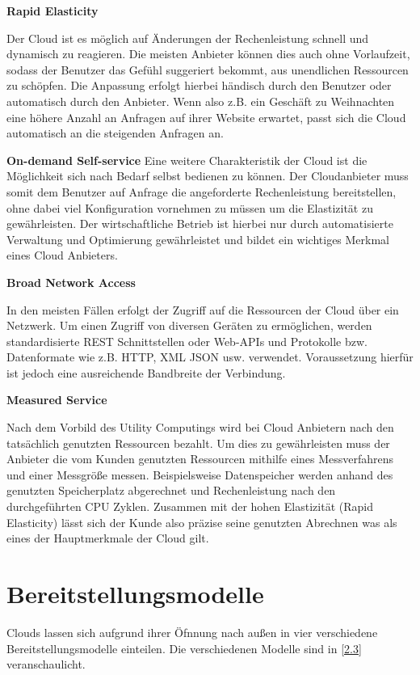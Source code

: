 \textbf{Rapid Elasticity}

Der Cloud ist es möglich auf Änderungen der Rechenleistung schnell und dynamisch zu reagieren. Die meisten Anbieter können dies auch ohne Vorlaufzeit, sodass der Benutzer das Gefühl suggeriert bekommt, aus unendlichen Ressourcen zu schöpfen. Die Anpassung erfolgt hierbei händisch durch den Benutzer oder automatisch durch den Anbieter. Wenn also z.B. ein Geschäft zu Weihnachten eine höhere Anzahl an Anfragen auf ihrer Website erwartet, passt sich die Cloud automatisch an die steigenden Anfragen an. \cite*[]{DAAS}
   
\textbf{On-demand Self-service}
Eine weitere Charakteristik der Cloud ist die Möglichkeit sich nach Bedarf selbst bedienen  zu können. Der Cloudanbieter muss somit dem Benutzer auf Anfrage die angeforderte Rechenleistung bereitstellen, ohne dabei viel Konfiguration vornehmen zu müssen um die Elastizität zu gewährleisten. Der wirtschaftliche Betrieb ist hierbei nur durch automatisierte Verwaltung und Optimierung gewährleistet und bildet ein wichtiges Merkmal eines Cloud Anbieters. \cite*[]{DAAS}
    
\textbf{Broad Network Access}

In den meisten Fällen erfolgt der Zugriff auf die Ressourcen der Cloud über ein Netzwerk. Um einen Zugriff von diversen Geräten zu ermöglichen, werden standardisierte REST Schnittstellen oder Web-APIs und Protokolle bzw. Datenformate wie z.B. HTTP, XML JSON usw. verwendet. Voraussetzung hierfür ist jedoch eine ausreichende Bandbreite der Verbindung. \cite*[]{DAAS}

\textbf{Measured Service}

Nach dem Vorbild des Utility Computings wird bei Cloud Anbietern nach den tatsächlich genutzten Ressourcen bezahlt. Um dies zu gewährleisten muss der Anbieter die vom Kunden genutzten Ressourcen mithilfe eines Messverfahrens und einer Messgröße messen. Beispielsweise Datenspeicher werden anhand des genutzten Speicherplatz abgerechnet und Rechenleistung nach den durchgeführten CPU Zyklen. Zusammen mit der hohen Elastizität (Rapid Elasticity) lässt sich der Kunde also präzise seine  genutzten Abrechnen was als eines der Hauptmerkmale der Cloud gilt. \cite*[]{SIGCOMM}

\section{Bereitstellungsmodelle}
Clouds lassen sich aufgrund ihrer Öfnnung nach außen in vier verschiedene Bereitstellungsmodelle einteilen. Die verschiedenen Modelle sind in \autoref{2.3} veranschaulicht.

